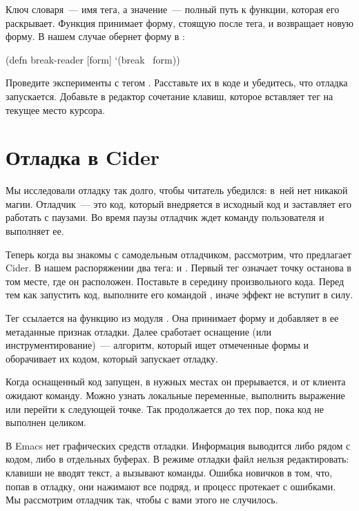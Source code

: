 Ключ словаря~--- имя тега, а значение~--- полный путь к функции, которая его раскрывает. Функция принимает форму, стоящую после тега, и возвращает новую форму. В нашем случае  обернет форму в :

\begin{english}
  \begin{clojure}
(defn break-reader [form]
  `(break ~form))
  \end{clojure}
\end{english}

Проведите эксперименты с тегом . Расставьте их в коде и убедитесь, что отладка запускается. Добавьте в редактор сочетание клавиш, которое вставляет тег на текущее место курсора.

\section{Отладка в Cider}

Мы исследовали отладку так долго, чтобы читатель убедился: в~ней нет никакой магии. Отладчик~--- это код, который внедряется в исходный код и заставляет его работать с паузами. Во время паузы отладчик ждет команду пользователя и выполняет ее.

Теперь когда вы знакомы с самодельным отладчиком, рассмотрим, что предлагает Cider. В нашем распоряжении два тега:  и . Первый тег означает точку останова в том месте, где он расположен. Поставьте  в середину произвольного кода. Перед тем как запустить код, выполните его командой , иначе эффект не вступит в силу.

Тег  ссылается на функцию  из модуля . Она принимает форму и добавляет в ее метаданные признак отладки. Далее сработает оснащение (или инструментирование)~--- алгоритм, который ищет отмеченные формы и оборачивает их кодом, который запускает отладку.

Когда оснащенный код запущен, в нужных местах он прерывается, и от клиента ожидают команду. Можно узнать локальные переменные, выполнить выражение или перейти к следующей точке. Так продолжается до тех пор, пока код не выполнен целиком.

В Emacs нет графических средств отладки. Информация выводится либо рядом с кодом, либо в отдельных буферах. В режиме отладки файл нельзя редактировать: клавиши не вводят текст, а вызывают команды. Ошибка новичков в том, что, попав в отладку, они нажимают все подряд, и процесс протекает с ошибками. Мы рассмотрим отладчик так, чтобы с вами этого не случилось.

